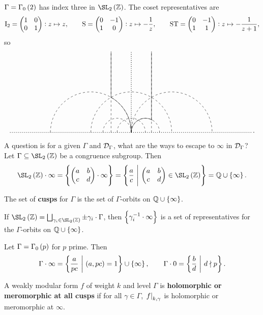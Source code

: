 \begin{example*}
$ \Gamma = \Gamma_0\br{2} $ has index three in $ \SL_2\br{\ZZ} $. The coset representatives are
$$ \mathrm{I}_2 = \begin{pmatrix} 1 & 0 \\ 0 & 1 \end{pmatrix} : z \mapsto z, \qquad \mathrm{S} = \begin{pmatrix} 0 & -1 \\ 1 & 0 \end{pmatrix} : z \mapsto -\dfrac{1}{z}, \qquad \mathrm{S}\mathrm{T} = \begin{pmatrix} 0 & -1 \\ 1 & 1 \end{pmatrix} : z \mapsto -\dfrac{1}{z + 1}, $$
so
$$
\begin{tikzpicture}[scale=2]
\draw [dotted, thick] (-3, 0) to (3, 0);
\draw [dotted, thick] (0, 0) to (0, 2);
\draw [dashed] (-2, 0) arc (180:0:1);
\draw [dashed] (-1, 0) arc (180:0:1);
\draw [dashed] (0, 0) arc (180:0:1);
\draw [dashed] (-0.7, 0) arc (180:0:0.35);
\draw [dashed] (-0.35, 0) arc (180:0:0.35);
\draw [dashed] (0, 0) arc (180:0:0.35);
\draw [dashed] (-0.5, 0) to (-0.5, 2);
\draw [dashed] (0.5, 0) to (0.5, 2);
\draw (-0.5, 0.866) arc (60:0:1);
\draw (0, 0) arc (180:60:0.35);
\draw (-0.5, 0.866) to (-0.5, 2);
\draw (0.5, 0.3) to (0.5, 2);
\end{tikzpicture}.
$$
\end{example*}

A question is for a given $ \Gamma $ and $ \mathcal{D}_\Gamma $, what are the ways to escape to $ \infty $ in $ \mathcal{D}_\Gamma $? Let $ \Gamma \subseteq \SL_2\br{\ZZ} $ be a congruence subgroup. Then
$$ \SL_2\br{\ZZ} \cdot \infty = \cbr{\twobytwo{a}{b}{c}{d} \cdot \infty} = \cbr{\dfrac{a}{c} \st \twobytwo{a}{b}{c}{d} \in \SL_2\br{\ZZ}} = \QQ \cup \cbr{\infty}. $$

\begin{definition}
The set of \textbf{cusps} for $ \Gamma $ is the set of $ \Gamma $-orbits on $ \QQ \cup \cbr{\infty} $.
\end{definition}

\begin{note*}
If $ \SL_2\br{\ZZ} = \bigsqcup_{\gamma_i \in \SL_2\br{\ZZ}} \pm\gamma_i \cdot \Gamma $, then $ \cbr{\gamma_i^{-1} \cdot \infty} $ is a set of representatives for the $ \Gamma $-orbits on $ \QQ \cup \cbr{\infty} $.
\end{note*}

\begin{example*}
Let $ \Gamma = \Gamma_0\br{p} $ for $ p $ prime. Then
$$ \Gamma \cdot \infty = \cbr{\dfrac{a}{pc} \st \br{a, pc} = 1} \cup \cbr{\infty}, \qquad \Gamma \cdot 0 = \cbr{\dfrac{b}{d} \st d \nmid p}. $$
\end{example*}

\begin{definition}
A weakly modular form $ f $ of weight $ k $ and level $ \Gamma $ is \textbf{holomorphic or meromorphic at all cusps} if for all $ \gamma \in \Gamma $, $ \left. f \right|_{k, \gamma} $ is holomorphic or meromorphic at $ \infty $.
\end{definition}

